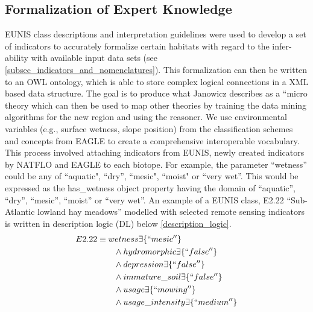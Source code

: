 \documentclass[authoryear, review,12pt,number]{elsarticle}
\begin{document}
\subsection{Formalization of Expert Knowledge}
EUNIS class descriptions and interpretation guidelines \citep{EUNISManual} were
used to develop a set of indicators to accurately formalize certain habitats
with regard to the infer-ability with available input data sets (see
\ref{subsec_indicators_and_nomenclatures}). This formalization can then be
written to an OWL ontology, which is able to store complex logical connections
in a XML based data structure. The goal is to produce what Janowicz describes
as a ``micro theory \citep{Janowicz2012} which can then be used to map other
theories by training the data mining algorithms for the new
region and using the reasoner. We use environmental variables (e.g., surface
wetness, slope position) from the classification schemes and concepts from
EAGLE to create a comprehensive interoperable vocabulary. This process involved
attaching indicators from EUNIS, newly created indicators by NATFLO and EAGLE
to each biotope. For example, the parameter ``wetness'' could be any of
``aquatic", ``dry'', ``mesic", ``moist" or ``very wet''. This would be expressed
as the has\_wetness object property having the domain of ``aquatic'', ``dry'',
``mesic'', ``moist'' or ``very wet''. An example of a EUNIS class, E2.22
``Sub-Atlantic lowland hay meadows'' modelled with selected remote sensing
indicators is written in description logic (DL) below \ref{description_logic}.
\begin{align*}
\label{description_logic}
E2.22 &\equiv wetness \exists \{``mesic''\} \\
&\qquad {} \land hydromorphic \exists \{``false''\} \\
&\qquad {} \land depression \exists \{``false''\} \\
&\qquad {} \land immature\_soil \exists \{``false''\} \\
&\qquad {} \land usage \exists \{``mowing''\} \\
&\qquad {} \land usage\_intensity \exists \{``medium''\} \\
\end{align*}
\end{document}
